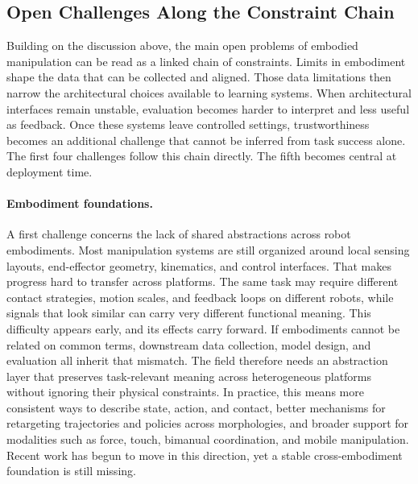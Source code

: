 \documentclass[acmsmall,screen,review,anonymous]{acmart}
\begin{document}
\subsection{Open Challenges Along the Constraint Chain}\label{sec:open_challenges}

Building on the discussion above, the main open problems of embodied manipulation can be read as a linked chain of constraints. Limits in embodiment shape the data that can be collected and aligned. Those data limitations then narrow the architectural choices available to learning systems. When architectural interfaces remain unstable, evaluation becomes harder to interpret and less useful as feedback. Once these systems leave controlled settings, trustworthiness becomes an additional challenge that cannot be inferred from task success alone. The first four challenges follow this chain directly. The fifth becomes central at deployment time.
\paragraph{Embodiment foundations.}\label{sec:challenge_embodiment}
A first challenge concerns the lack of shared abstractions across robot embodiments. 
Most manipulation systems are still organized around local sensing layouts, end-effector geometry, kinematics, and control interfaces. 
That makes progress hard to transfer across platforms. 
The same task may require different contact strategies, motion scales, and feedback loops on different robots, while signals that look similar can carry very different functional meaning. 
This difficulty appears early, and its effects carry forward. If embodiments cannot be related on common terms, downstream data collection, model design, and evaluation all inherit that mismatch. 
The field therefore needs an abstraction layer that preserves task-relevant meaning across heterogeneous platforms without ignoring their physical constraints. 
In practice, this means more consistent ways to describe state, action, and contact, better mechanisms for retargeting trajectories and policies across morphologies, and broader support for modalities such as force, touch, bimanual coordination, and mobile manipulation. 
Recent work has begun to move in this direction, yet a stable cross-embodiment foundation is still missing.
\end{document}
